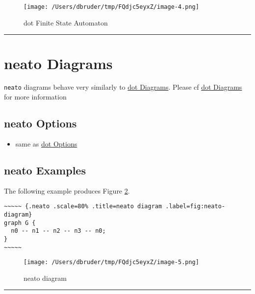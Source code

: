 \documentclass[]{article}
\begin{document}
\normalsize

\begin{figure}[htbp]
\centering
\texttt{[image: /Users/dbruder/tmp/FQdjc5eyxZ/image-4.png]}
\caption{dot Finite State Automaton\label{fig:dot-fsa}}
\end{figure}

\begin{center}\rule{3in}{0.4pt}\end{center}

\newpage

\section{neato Diagrams}\label{neato-diagrams}

\texttt{neato} diagrams behave very similarly to
\hyperref[dot-diagrams]{dot Diagrams}. Please cf
\hyperref[dot-diagrams]{dot Diagrams} for more information

\subsection{neato Options}\label{neato-options}

\begin{itemize}
\itemsep1pt\parskip0pt
\item
  same as \hyperref[dot-options]{dot Options}
\end{itemize}

\subsection{neato Examples}\label{neato-examples}

The following example produces Figure \ref{fig:neato-diagram}.

\scriptsize

\begin{verbatim}
~~~~~ {.neato .scale=80% .title=neato diagram .label=fig:neato-diagram}
graph G {
  n0 -- n1 -- n2 -- n3 -- n0;
}
~~~~~
\end{verbatim}

\normalsize

\begin{figure}[htbp]
\centering
\texttt{[image: /Users/dbruder/tmp/FQdjc5eyxZ/image-5.png]}
\caption{neato diagram\label{fig:neato-diagram}}
\end{figure}

\begin{center}\rule{3in}{0.4pt}\end{center}
\end{document}

